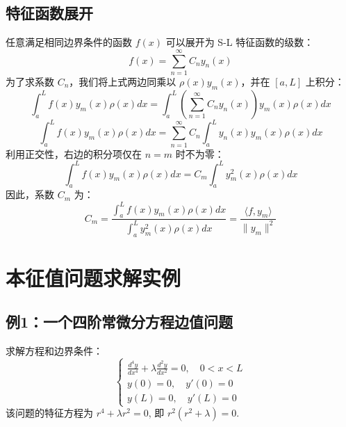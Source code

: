 \documentclass{article}
\begin{document}
	\subsection{特征函数展开}
	任意满足相同边界条件的函数 $f(x)$ 可以展开为 S-L 特征函数的级数：
	$$
	f(x) = \sum_{n=1}^{\infty} C_n y_n(x)
	$$
	为了求系数 $C_n$，我们将上式两边同乘以 $\rho(x)y_m(x)$，并在 $[a,L]$ 上积分：
	$$
	\int_a^L f(x) y_m(x) \rho(x) dx = \int_a^L \left(\sum_{n=1}^{\infty} C_n y_n(x)\right) y_m(x) \rho(x) dx
	$$
	$$
	\int_a^L f(x) y_m(x) \rho(x) dx = \sum_{n=1}^{\infty} C_n \int_a^L y_n(x) y_m(x) \rho(x) dx
	$$
	利用正交性，右边的积分项仅在 $n=m$ 时不为零：
	$$
	\int_a^L f(x) y_m(x) \rho(x) dx = C_m \int_a^L y_m^2(x) \rho(x) dx
	$$
	因此，系数 $C_m$ 为：
	$$
	C_m = \frac{\int_a^L f(x) y_m(x) \rho(x) dx}{\int_a^L y_m^2(x) \rho(x) dx} = \frac{\langle f, y_m \rangle}{\|y_m\|^2}
	$$
	
	\section{本征值问题求解实例}
	
	\subsection{例1：一个四阶常微分方程边值问题}
	
	求解方程和边界条件：
	$$
	\begin{cases}
		\frac{d^4 y}{dx^4} + \lambda \frac{d^2 y}{dx^2} = 0, \quad 0 < x < L \\
		y(0)=0, \quad y'(0)=0 \\
		y(L)=0, \quad y'(L)=0
	\end{cases}
	$$
	该问题的特征方程为 $r^4 + \lambda r^2 = 0$, 即 $r^2(r^2+\lambda)=0$.
	
\end{document}
